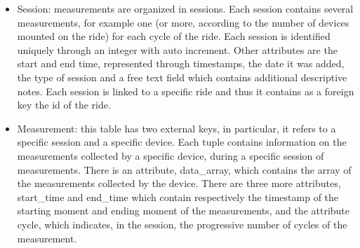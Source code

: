 \begin{itemize}
    \item  Session: measurements are organized in sessions. Each session contains several measurements, for example one (or more, according to the number of devices mounted on the ride) for each cycle of the ride. Each session is identified uniquely through an integer with auto increment. Other attributes are the start and end time, represented through timestamps, the date it was added, the type of session and a free text field which contains additional descriptive notes. Each session is linked to a specific ride and thus it contains as a foreign key the id of the ride.
    \item  Measurement: this table has two external keys, in particular, it refers to a specific session and a specific device. Each tuple contains information on the measurements collected by a specific device, during a specific session of measurements. There is an attribute, data\_array, which contains the array of the measurements collected by the device. There are three more attributes, start\_time and end\_time which contain respectively the timestamp of the starting moment and ending moment of the measurements, and the attribute cycle, which indicates, in the session, the progressive number of cycles of the measurement.
\end{itemize}